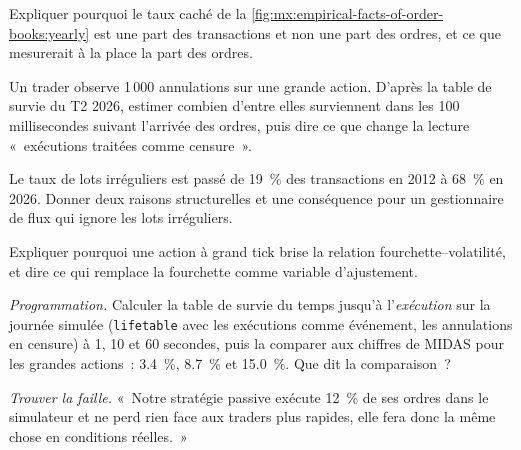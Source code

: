 \begin{exercise}[$\star$]\label{exo:mx:empirical-facts-of-order-books:3}
Expliquer pourquoi le taux caché de la \cref{fig:mx:empirical-facts-of-order-books:yearly} est une part des transactions et non une part des ordres, et ce que
mesurerait à la place la part des ordres.
\end{exercise}

\begin{exercise}[$\star\star$]\label{exo:mx:empirical-facts-of-order-books:4}
Un trader observe 1\,000 annulations sur une grande action. D'après la table de survie du T2 2026, estimer combien d'entre elles surviennent dans les 100 millisecondes
suivant l'arrivée des ordres, puis dire ce que change la lecture «~exécutions traitées comme censure~».
\end{exercise}

\begin{exercise}[$\star\star$]\label{exo:mx:empirical-facts-of-order-books:5}
Le taux de lots irréguliers est passé de 19~\% des transactions en 2012 à 68~\% en 2026. Donner deux raisons structurelles et une conséquence pour un gestionnaire de flux qui ignore les lots
irréguliers.
\end{exercise}

\begin{exercise}[$\star\star$]\label{exo:mx:empirical-facts-of-order-books:6}
Expliquer pourquoi une action à grand tick brise la relation fourchette--volatilité, et dire ce qui remplace la fourchette comme variable d'ajustement.
\end{exercise}

\begin{exercise}[$\star\star\star$]\label{exo:mx:empirical-facts-of-order-books:7}
\emph{Programmation.} Calculer la table de survie du temps jusqu'à l'\emph{exécution} sur la journée simulée (\texttt{lifetable} avec les exécutions comme événement, les annulations
en censure) à 1, 10 et 60 secondes, puis la comparer aux chiffres de MIDAS pour les grandes actions~: 3.4~\%, 8.7~\% et 15.0~\%. Que dit la comparaison~?
\end{exercise}

\begin{exercise}[$\star\star\star$]\label{exo:mx:empirical-facts-of-order-books:8}
\emph{Trouver la faille.} «~Notre stratégie passive exécute 12~\% de ses ordres dans le simulateur et ne perd rien face aux traders plus rapides, elle fera donc la même chose en conditions réelles.~»
\end{exercise}

